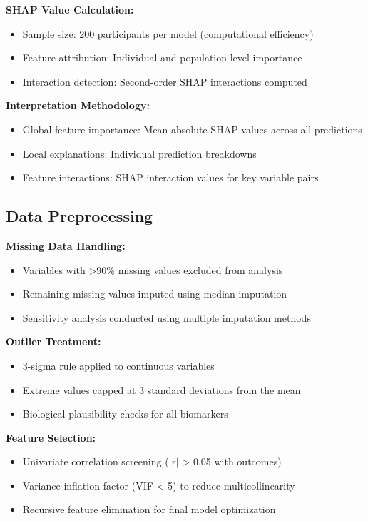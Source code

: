 \documentclass[11pt,a4paper]{article}
\begin{document}
\textbf{SHAP Value Calculation:} 
\begin{itemize}
\item Sample size: 200 participants per model (computational efficiency)
\item Feature attribution: Individual and population-level importance
\item Interaction detection: Second-order SHAP interactions computed
\end{itemize}

\textbf{Interpretation Methodology:}
\begin{itemize}
\item Global feature importance: Mean absolute SHAP values across all predictions
\item Local explanations: Individual prediction breakdowns
\item Feature interactions: SHAP interaction values for key variable pairs
\end{itemize}

\subsection{Data Preprocessing}

\textbf{Missing Data Handling:}
\begin{itemize}
\item Variables with >90\% missing values excluded from analysis
\item Remaining missing values imputed using median imputation
\item Sensitivity analysis conducted using multiple imputation methods
\end{itemize}

\textbf{Outlier Treatment:}
\begin{itemize}
\item 3-sigma rule applied to continuous variables
\item Extreme values capped at 3 standard deviations from the mean
\item Biological plausibility checks for all biomarkers
\end{itemize}

\textbf{Feature Selection:}
\begin{itemize}
\item Univariate correlation screening ($|r|$ > 0.05 with outcomes)
\item Variance inflation factor (VIF < 5) to reduce multicollinearity
\item Recursive feature elimination for final model optimization
\end{itemize}
\end{document}
